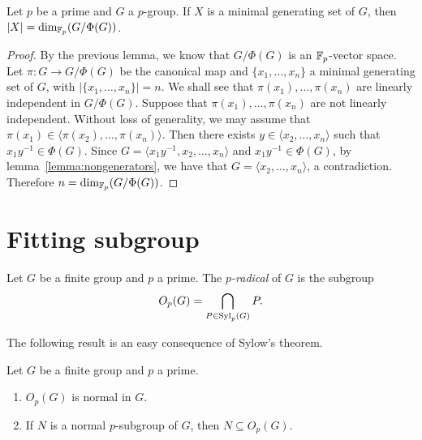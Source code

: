 \begin{theorem}[Burnside]
	\label{theorem:Burnside:basis}
	Let $p$ be a prime and  $G$ a $p$-group. If $X$ is a minimal generating set of $G$, then $|X|=\dim_{\mathbb{F}_p} (G/\Phi(G))$. 
\end{theorem}


\begin{proof}
	By the previous lemma, we know that $G/\Phi(G)$ is an $\mathbb{F}_p$-vector space. Let $\pi\colon G\to G/\Phi(G)$ be the canonical map
	and $\{x_1,\dots,x_n\}$ a minimal generating set of $G$, with $|\{x_1,\dots,x_n\}|=n$.
	We shall see that $\pi(x_1),\dots,\pi(x_n)$ are linearly independent in $G/\Phi(G)$.  Suppose that
	$\pi(x_1),\dots,\pi(x_n)$ are not linearly independent. Without loss of generality, we may assume that
	$\pi(x_1)\in\langle \pi(x_2),\dots,\pi(x_n)\rangle$. Then there exists $y\in
	\langle x_2,\dots,x_n\rangle$ such that $x_1y^{-1}\in\Phi(G)$. Since $G=\langle x_1y^{-1},x_2,\dots,x_n\rangle$ and $x_1y^{-1}\in\Phi(G)$, by lemma~\ref{lemma:nongenerators}, we have that $G=\langle x_2,\dots, x_n\rangle$, a contradiction.
	Therefore $n=\dim_{\mathbb{F}_p}(G/\Phi(G))$.
\end{proof}



\section{Fitting subgroup}

\begin{definition}
	Let $G$ be a finite group and $p$ a prime. The
	{\em $p$-radical} of $G$ is the subgroup
	\[
		O_p(G)=\bigcap_{P\in\mathrm{Syl}_p(G)}P.
	\]
\end{definition}

The following result is an easy consequence of Sylow's theorem.  
\begin{lemma}
	\label{lemma:core:Op(G)}
	Let $G$ be a finite group and $p$ a prime. 
	\begin{enumerate}
		\item $O_p(G)$ is normal in $G$.
		\item If $N$ is a normal $p$-subgroup of $G$, then $N\subseteq O_p(G)$.
	\end{enumerate}
\end{lemma}

